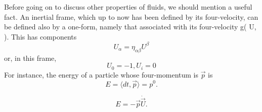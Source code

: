 \documentclass{article}
\begin{document}
Before going on to discuss other properties of fluids, we should mention a useful fact. An inertial frame, which up to now has been defined by its four-velocity, can be defined also by a one-form, namely that associated with its four-velocity g( U, ). This has components
$$ U_\alpha = \eta_{\alpha \beta} U^\beta$$
or, in this frame,
$$ U_0 = -1, U_i = 0 $$
For instance, the energy of a particle whose four-momentum
is $\vec{p}$ is
$$ E = \langle dt, \vec{p} \rangle = p^0. $$

$$ E = -\vec{p} \dot \vec{U}. $$
\end{document}
